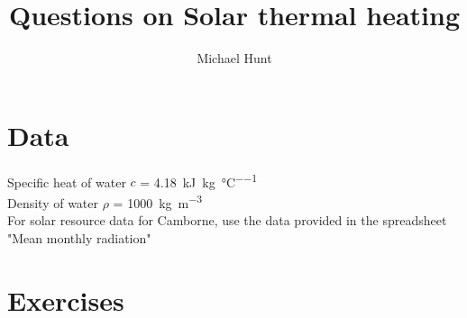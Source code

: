 \documentclass{article} %
\title{Questions on Solar thermal heating}
\author{Michael Hunt}
\date{}
\begin{document}
\maketitle

\section*{Data}

Specific heat of water $c$ = \SI{4.18}{\kilo\joule\per\kg\per\celsius}\\
Density of water $\rho$ = \SI{1000}{\kg\per\metre\cubed}\\
For solar resource data for Camborne, use the data provided in the spreadsheet "Mean monthly radiation"

\section*{Exercises}
\end{document}
